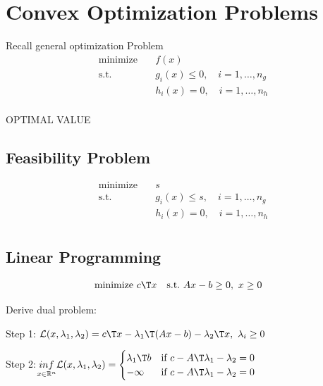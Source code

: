 \section{Convex Optimization Problems}

Recall general optimization Problem
\begin{equation}
	\begin{aligned}
		\operatorname{minimize}\quad & f(x)                               \\
		\text{s.t.}                  & g_i(x) \le 0,\quad i = 1,\dots,n_g \\
		                             & h_i(x) = 0,\quad i = 1,\dots,n_h   \\
	\end{aligned}
	\label{eq:optimization}
\end{equation}

OPTIMAL VALUE

\subsection{Feasibility  Problem}

\begin{equation}
	\begin{aligned}
		\operatorname{minimize}\quad & s                                  \\
		\text{s.t.}                  & g_i(x) \le s,\quad i = 1,\dots,n_g \\
		                             & h_i(x) = 0,\quad i = 1,\dots,n_h   \\
	\end{aligned}
\end{equation}

\subsection{Linear Programming}

\begin{equation}
	\begin{aligned}
		\operatorname{minimize}\  & c\T x & \text{s.t.}\  & Ax-b \ge 0,\ x\ge0
	\end{aligned}
\end{equation}

Derive dual problem:

Step 1: $\mathcal{L}(x,\lambda_1,\lambda_2) = c\T x-\lambda_1\T (Ax-b) -\lambda_2\T x,\ \lambda_i \ge0$

Step 2:$\underset{x \in \mathcal{\mathbb{R}}^n}{inf}\mathcal{L}(x,\lambda_1,\lambda_2)
	= \begin{cases} \lambda_1\T b & \text{if }c-A\T\lambda_1-\lambda_2=0  \\
              -\infty       & \text{if } c-A\T\lambda_1-\lambda_2=0\end{cases}$

